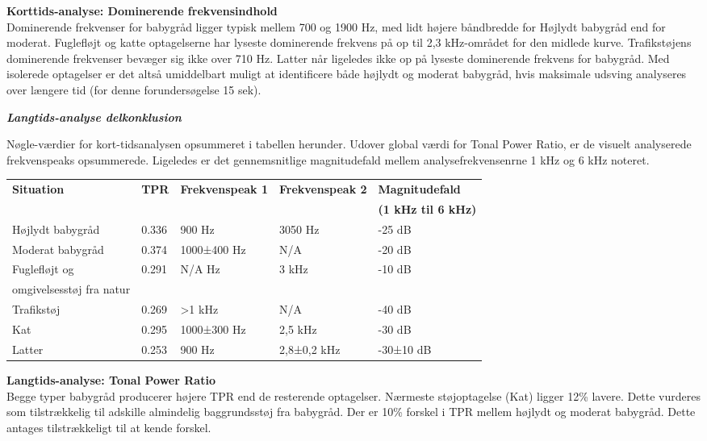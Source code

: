 \textbf{Korttids-analyse: Dominerende frekvensindhold}	\\
Dominerende frekvenser for babygråd ligger typisk mellem 700 og 1900 Hz, med lidt højere båndbredde for Højlydt babygråd end for moderat. Fuglefløjt og katte optagelserne har lyseste dominerende frekvens på op til 2,3 kHz-området for den midlede kurve. 
Trafikstøjens dominerende frekvenser bevæger sig ikke over 710 Hz. Latter når ligeledes ikke op på lyseste dominerende frekvens for babygråd. Med isolerede optagelser er det altså umiddelbart muligt at identificere både højlydt og moderat babygråd, hvis maksimale udsving analyseres over længere tid (for denne forundersøgelse 15 sek).

\newpage
\begin{center} \textit{\textbf{Langtids-analyse delkonklusion}} \end{center}
Nøgle-værdier for kort-tidsanalysen opsummeret i tabellen herunder. Udover global værdi for Tonal Power Ratio, er de visuelt analyserede frekvenspeaks opsummerede. Ligeledes er det gennemsnitlige magnitudefald mellem analysefrekvensenrne 1 kHz og 6 kHz noteret. 
\begin{center}
    \begin{tabular}{ | l | l | l | l | l |}
    \hline
    \textbf{Situation} 	& \textbf{TPR}  &\textbf{Frekvenspeak 1}	&\textbf{Frekvenspeak 2}	&\textbf{Magnitudefald} \\&&&&\textbf{(1 kHz til 6 kHz)}  	\\ \hline
    Højlydt babygråd 	& 0.336   				&900 Hz 				&3050 Hz				&-25 dB	\\ \hline
    Moderat babygråd 	& 0.374  				&1000±400 Hz 			&N/A					&-20 dB 	\\ \hline
    Fuglefløjt og 		& 0.291  				&N/A Hz 				&3 kHz					&-10 dB	\\ omgivelsesstøj fra natur & & & &	\\ \hline	
    Trafikstøj 			& 0.269  				&>1 kHz 				&N/A					&-40 dB	\\ \hline
    Kat 				& 0.295  				&1000±300 Hz			&2,5 kHz				&-30 dB	\\ \hline
    Latter 				& 0.253  				&900 Hz					&2,8±0,2 kHz			&-30±10 dB	\\ \hline
    \end{tabular}
\end{center}

\textbf{Langtids-analyse: Tonal Power Ratio}	\\
Begge typer babygråd producerer højere TPR end de resterende optagelser. Nærmeste støjoptagelse (Kat) ligger  12\% lavere. Dette vurderes som tilstrækkelig til adskille almindelig baggrundsstøj fra babygråd. Der er 10\% forskel i TPR mellem højlydt og moderat babygråd. Dette antages tilstrækkeligt til at kende forskel.

